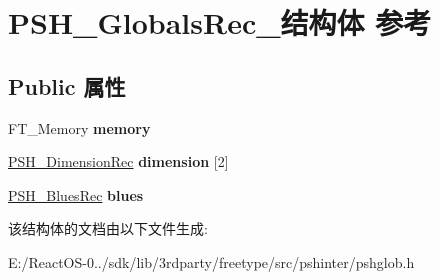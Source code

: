 \hypertarget{struct_p_s_h___globals_rec__}{}\section{P\+S\+H\+\_\+\+Globals\+Rec\+\_\+结构体 参考}
\label{struct_p_s_h___globals_rec__}
\subsection*{Public 属性}
\begin{DoxyCompactItemize}
\item 
\mbox{\label{struct_p_s_h___globals_rec___a054764c4019f0d5f2bb4ada22cabe529}} 
F\+T\+\_\+\+Memory {\bfseries memory}
\item 
\mbox{\label{struct_p_s_h___globals_rec___ad15bac2511207d8e4bda122b39bd29fd}} 
\hyperlink{struct_p_s_h___dimension_rec__}{P\+S\+H\+\_\+\+Dimension\+Rec} {\bfseries dimension} \mbox{[}2\mbox{]}
\item 
\mbox{\label{struct_p_s_h___globals_rec___a733fc6d08bb12a7610c2e4e766c4cc25}} 
\hyperlink{struct_p_s_h___blues_rec__}{P\+S\+H\+\_\+\+Blues\+Rec} {\bfseries blues}
\end{DoxyCompactItemize}


该结构体的文档由以下文件生成\+:\begin{DoxyCompactItemize}
\item 
E\+:/\+React\+O\+S-\/0../sdk/lib/3rdparty/freetype/src/pshinter/pshglob.\+h\end{DoxyCompactItemize}
